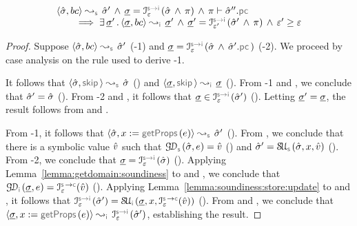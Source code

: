 \begin{lemma}\label{lemma:soundiness:basic:commands}
$$
\begin{array}{l}
\absbsemrule{\sstate, \bcmd}{\sstate'}{\symbolic} 
    \, \wedge \, \istate = \interpret{\symbinst}{\senv}(\sstate \, \wedge \, \pc)
    \, \wedge \, \pc \vdash \sstate''.\pcsel \\ \quad \quad
     \implies 
        \exists \, \istate' \, . \, \absbsemrule{\istate, \bcmd}{\istate'}{\instrumented} \, \wedge \, 
            \istate' = \interpret{\symbinst}{\senv'}(\sstate' \, \wedge \, \pc)  \, \wedge \, 
            \senv' \fextends  \senv
\end{array}
$$
\end{lemma}
\begin{proof}
Suppose $\absbsemrule{\sstate, \bcmd}{\sstate'}{\symbolic}$ (\hyp{1}) and 
$\istate = \interpret{\symbinst}{\senv}(\sstate \, \wedge \, \sstate'.\pcsel)$ (\hyp{2}).
We proceed by case analysis on the rule used to derive \hyp{1}. 
\vspace{3pt}

\noindent {} It follows that $\absbsemrule{\sstate, \jsilskip}{\sstate}{\symbolic}$ () and 
$\absbsemrule{\istate, \jsilskip}{\istate}{\instrumented}$ (). 
From \hyp{1} and , we conclude that $\hat{\sigma}' = \hat{\sigma}$ (). 
From \hyp{2} and , it follows that $\istate \in \interpret{\symbinst}{\senv}(\sstate')$ (). 
Letting $\underline{\sigma}' = \underline{\sigma}$, the result follows from  and . 
\vspace{5pt}

\noindent {} From \hyp{1}, it follows that $\absbsemrule{\sstate, \jvar := \getfields(\jsilexpr)}{\sstate'}{\symbolic}$ (). 
From , we conclude that there is a symbolic value $\hat{v}$ such that 
$\absgetdomainfun{\symbolic}(\sstate, \jsilexpr) = \sexprv$ () 
and $\sstate' = \stupdt{\symbolic}(\sstate, \jvar, \sexprv)$ ().  
From \hyp{2}, we conclude that $\istate = \interpret{\symbinst}{\senv}(\sstate)$ (). 
Applying Lemma~\ref{lemma:getdomain:soundiness} to  and , we conclude that 
$\absgetdomainfun{\instrumented}(\istate, \jsilexpr) = \interpret{\symbconc}{\senv}(\sexprv)$ (). 
Applying Lemma~\ref{lemma:soundiness:store:update} to  and , it follows that 
$ \interpret{\symbinst}{\senv}(\sstate') = \stupdt{\instrumented}(\istate, \jvar, \interpret{\symbconc}{\senv}(\sexprv))$ (). 
From  and , we conclude that $\absbsemrule{\istate, \jvar := \getfields(\jsilexpr)}{\interpret{\symbinst}{\senv}(\sstate')}{\instrumented}$, establishing the result. 
\vspace{5pt}


\end{proof}
